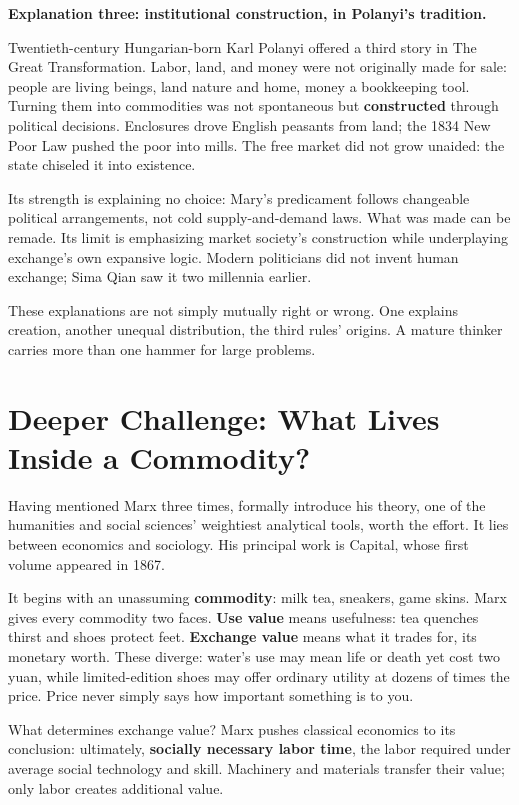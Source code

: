 \textbf{Explanation three: institutional construction, in Polanyi's tradition.}

Twentieth-century Hungarian-born Karl Polanyi offered a third story in The Great Transformation. Labor, land, and money were not originally made for sale: people are living beings, land nature and home, money a bookkeeping tool. Turning them into commodities was not spontaneous but \textbf{constructed} through political decisions. Enclosures drove English peasants from land; the 1834 New Poor Law pushed the poor into mills. The free market did not grow unaided: the state chiseled it into existence.

Its strength is explaining no choice: Mary's predicament follows changeable political arrangements, not cold supply-and-demand laws. What was made can be remade. Its limit is emphasizing market society's construction while underplaying exchange's own expansive logic. Modern politicians did not invent human exchange; Sima Qian saw it two millennia earlier.

These explanations are not simply mutually right or wrong. One explains creation, another unequal distribution, the third rules' origins. A mature thinker carries more than one hammer for large problems.

\section[What Lives Inside a Commodity?]{Deeper Challenge: What Lives Inside a Commodity?}
Having mentioned Marx three times, formally introduce his theory, one of the humanities and social sciences' weightiest analytical tools, worth the effort. It lies between economics and sociology. His principal work is Capital, whose first volume appeared in 1867.

It begins with an unassuming \textbf{commodity}: milk tea, sneakers, game skins. Marx gives every commodity two faces. \textbf{Use value} means usefulness: tea quenches thirst and shoes protect feet. \textbf{Exchange value} means what it trades for, its monetary worth. These diverge: water's use may mean life or death yet cost two yuan, while limited-edition shoes may offer ordinary utility at dozens of times the price. Price never simply says how important something is to you.

What determines exchange value? Marx pushes classical economics to its conclusion: ultimately, \textbf{socially necessary labor time}, the labor required under average social technology and skill. Machinery and materials transfer their value; only labor creates additional value.


